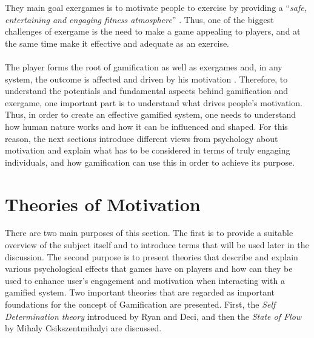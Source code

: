 They main goal exergames is to motivate people to exercise by providing a ``\textit{safe, entertaining and engaging fitness atmosphere}'' \cite{altamimi2012survey}. Thus, one of the biggest challenges of exergame is the need to make a game appealing to players, and at the same time make it effective and adequate as an exercise. \\\\
The player forms the root of gamification as well as exergames and, in any system, the outcome is affected and driven by his motivation \cite{zichermann2011gamification}. Therefore, to understand the potentials and fundamental aspects behind gamification and exergame, one important part is to understand what drives people's motivation. Thus, in  order  to  create  an  effective  gamified system, one needs to understand  how  human  nature  works  and  how  it can be influenced and shaped. For this reason, the next sections introduce different views from psychology about motivation and explain what has to be considered in terms of truly engaging individuals, and how gamification can use this in order to achieve its purpose. 

\pagebreak
\section{Theories of Motivation}
\label{chapter:motivation}
There are two main purposes of this section. The first is to provide a suitable overview of the subject itself and to introduce terms that will be used later in the discussion. The second purpose is to present theories that describe and explain various psychological effects that games have on players and how can they be used to enhance user's engagement and motivation when interacting with a gamified system. Two important theories that are regarded as important foundations for  the  concept of Gamification are presented. First, the \textit{Self Determination theory} introduced by Ryan and Deci, and then the \textit{State of Flow} by Mihaly Csikszentmihalyi are discussed. 
